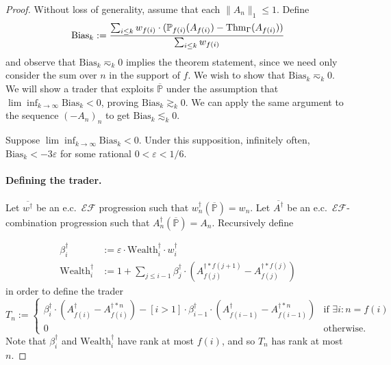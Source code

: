 \documentclass[authordate,onecolumn,noenvironments]{miri-tech-article}
\numberwithin{equation}{subsection}
\newcommand{\seq}[1]{{\overline{#1}}}
\newcommand{\nn}{n}
\newcommand{\fuz}{w}
\newcommand{\deff}{f}
\newcommand{\ec}[1][\ ]{e.c.#1}
\newcommand{\exfeatures}{\mathcal{E\!F}} %
\newcommand{\aff}{A}
\newcommand{\gens}{\dagger}
\newcommand{\gen}[1]{{#1^\gens}}
\newcommand{\BelState}{\mathbb{P}}
\newcommand{\pt}{\BelState}
\newcommand{\MP}{\seq{\pt}}
\newcommand{\ftn}{(\MP)} %
\newcommand{\Theory}{\Gamma}
\newcommand{\thmind}[1][\Theory]{\operatorname{Thm}_{#1}\-} %
\begin{document}
\wubaff*

\begin{proof}
  Without loss of generality, assume that each $\|\aff_n\|_1 \leq 1$.  
  Define
  \[
    \mathrm{Bias}_k :=
    \frac
    {\sum_{i\leq k }\fuz_{\deff(i)}  \cdot(\pt_{\deff(i)}(\aff_{\deff(i)})-\thmind(\aff_{\deff(i)}))}
    {\sum_{i\leq k} \fuz_{\deff(i)}}
  \]
  and observe that $\mathrm{Bias}_k \eqsim_k 0$ implies the theorem statement, since we need only consider the sum over $n$ in the support of $\deff$.
  We wish to show that $\mathrm{Bias}_k \eqsim_k 0$.  We will show a trader that exploits $\MP$ under the assumption that $\lim\inf_{k \to \infty} \mathrm{Bias}_k < 0$, proving $\mathrm{Bias}_k \gtrsim_k 0$.  We can apply the same argument to the sequence $(-\aff_n)_n$ to get $\mathrm{Bias}_k \lesssim_k 0$.

Suppose $\lim\inf_{k \to \infty} \mathrm{Bias}_k < 0$.  Under this supposition, infinitely often, $\mathrm{Bias}_k < - 3 \varepsilon$ for some rational $0 < \varepsilon < 1/6$.

\paragraph{Defining the trader.}

  Let $\seq{\gen \fuz}$ be an \ec $\exfeatures$ progression such that $\gen{\fuz_n} \ftn = \fuz_n$.  Let $\seq{\gen \aff}$ be an \ec $\exfeatures$-combination progression such that $\gen{\aff_n} \ftn = \aff_n$.  Recursively define

\begin{align*}
  \gen{\beta_i} &:= \varepsilon \cdot \gen{\mathrm{Wealth}_i} \cdot \gen{\fuz_i }
  \\
  \gen{\mathrm{Wealth}_i} &:= 1 + \sum_{j\le i-1} \gen{\beta_j} \cdot \left(\aff_{\deff(j)}^{\gens * \deff(j+1)} - \aff_{\deff(j)}^{\gens * \deff(j)}\right)
\end{align*}
in order to define the trader
\[
  T_\nn := \begin{cases}
    \gen{\beta_i} \cdot \left(\gen{\aff_{\deff(i)}} - \aff_{\deff(i)}^{\gens * n}\right)  - [i > 1] \cdot \gen{\beta_{i-1}} \cdot \left(\gen{\aff_{\deff(i-1)}} - \aff_{\deff(i-1)}^{\gens * n} \right)
    & \text{if $\exists i: \nn = \deff(i)$}
    \\
    0 & \text{otherwise.}
  \end{cases}
\]
Note that $\gen{\beta_i}$ and $\gen{\mathrm{Wealth}_i}$ have rank at most $\deff(i)$, and so $T_n$ has rank at most $n$.


\end{proof}
\end{document}
